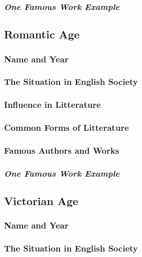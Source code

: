 \subsubsection{\textit{One Famous Work Example}}

\newpage
\subsection{Romantic Age}

\subsubsection{Name and Year}

\subsubsection{The Situation in English Society}

\subsubsection{Influence in Litterature}

\subsubsection{Common Forms of Litterature}

\subsubsection{Famous Authors and Works}

\subsubsection{\textit{One Famous Work Example}}

\newpage
\subsection{Victorian Age}

\subsubsection{Name and Year}

\subsubsection{The Situation in English Society}

